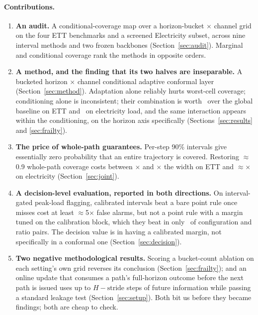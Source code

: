 \documentclass[11pt]{article}
\begin{document}
\paragraph{Contributions.}
\begin{enumerate}
\item \textbf{An audit.} A conditional-coverage map over a horizon-bucket $\times$ channel grid on the four ETT benchmarks and a screened Electricity subset, across nine interval methods and two frozen backbones (Section~\ref{sec:audit}). Marginal and conditional coverage rank the methods in opposite orders.
\item \textbf{A method, and the finding that its two halves are inseparable.} A bucketed horizon $\times$ channel conditional adaptive conformal layer (Section~\ref{sec:method}). Adaptation alone reliably hurts worst-cell coverage; conditioning alone is inconsistent; their combination is worth \ettPminusGD\ over the global baseline on ETT and \eclPminusGD\ on electricity load, and the same interaction appears within the conditioning, on the horizon axis specifically (Sections~\ref{sec:results} and \ref{sec:frailty}).
\item \textbf{The price of whole-path guarantees.} Per-step 90\% intervals give essentially zero probability that an entire trajectory is covered. Restoring $\approx$0.9 whole-path coverage costs between \ettMaxScoreRatio$\times$ and \ettBonferroniRatio$\times$ the width on ETT and $\approx$\eclMaxScoreRatio$\times$ on electricity (Section~\ref{sec:joint}).
\item \textbf{A decision-level evaluation, reported in both directions.} On interval-gated peak-load flagging, calibrated intervals beat a bare point rule once misses cost at least $\approx$5$\times$ false alarms, but not a point rule with a margin tuned on the calibration block, which they beat in only \dmPropBeatsMargin\ of configuration and ratio pairs. The decision value is in having a calibrated margin, not specifically in a conformal one (Section~\ref{sec:decision}).
\item \textbf{Two negative methodological results.} Scoring a bucket-count ablation on each setting's own grid reverses its conclusion (Section~\ref{sec:frailty}); and an online update that consumes a path's full-horizon outcome before the next path is issued uses up to $H - \text{stride}$ steps of future information while passing a standard leakage test (Section~\ref{sec:setup}). Both bit us before they became findings; both are cheap to check.
\end{enumerate}
\end{document}
